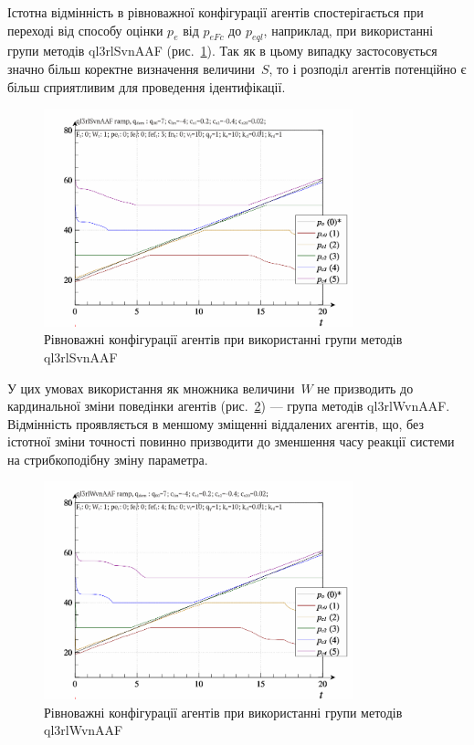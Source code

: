 Істотна відмінність в рівноважної конфігурації агентів
спостерігається при переході від способу оцінки
$ p_e $ від
$ p_{eFc} $ до
$ p_{eql} $, наприклад, при використанні групи методів ql3rlSvnAAF
(рис.~\ref{atu:f:qls_ramp_ql3rlSvnAAF}). Так як в цьому випадку застосовується
значно більш коректне визначення величини~$S$,
то і розподіл агентів потенційно є більш сприятливим для
проведення ідентифікації.

\begin{figure}[htb!]
  \begin{center}
    \includegraphics[width=0.8\textwidth]{p/ramp/qls-p_t_pi_ql3rlSvnAAF_ramp.png}
  \end{center}
  \caption{Рівноважні конфігурації агентів при використанні групи методів ql3rlSvnAAF}
  \label{atu:f:qls_ramp_ql3rlSvnAAF}
\end{figure}


У цих умовах використання як множника величини~$W$
не призводить до кардинальної зміни поведінки агентів
(рис.~\ref{atu:f:qls_ramp_ql3rlWvnAAF}) --- група методів ql3rlWvnAAF.
Відмінність проявляється в меншому зміщенні віддалених агентів, що, без
істотної зміни точності повинно призводити до зменшення часу
реакції системи на стрибкоподібну зміну параметра.


\begin{figure}[htb!]
  \begin{center}
    \includegraphics[width=0.8\textwidth]{p/ramp/qls-p_t_pi_ql3rlWvnAAF_ramp.png}
  \end{center}
  \caption{Рівноважні конфігурації агентів при використанні групи методів ql3rlWvnAAF}
  \label{atu:f:qls_ramp_ql3rlWvnAAF}
\end{figure}

